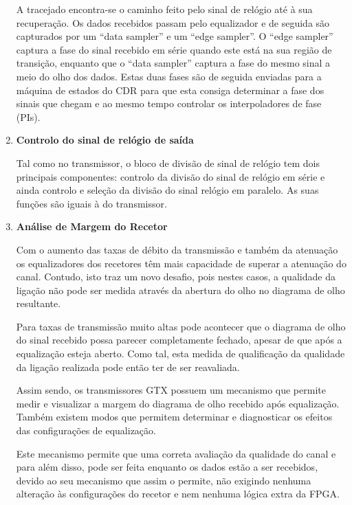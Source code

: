 \begin{enumerate}
	\hspace{1.0em}A tracejado encontra-se o caminho feito pelo sinal de relógio até à sua recuperação. 
	Os dados recebidos passam pelo equalizador e de seguida são capturados por um “data sampler” e um “edge sampler”. O “edge sampler” captura a fase do sinal recebido em série quando este está na sua região de transição, enquanto que o “data sampler” captura a fase do mesmo sinal a meio do olho dos dados. Estas duas fases são de seguida enviadas para a máquina de estados do CDR para que esta consiga determinar a fase dos sinais que chegam e ao mesmo tempo controlar os interpoladores de fase (PIs).
	
	\item \textbf{Controlo do sinal de relógio de saída} 
	
	Tal como no transmissor, o bloco de divisão de sinal de relógio tem dois principais componentes: controlo da divisão do sinal de relógio em série e ainda controlo e seleção da divisão do sinal relógio em paralelo. As suas funções são iguais à do transmissor.
	
	\item \textbf{Análise de Margem do Recetor}
	
	\hspace{1.0em}Com o aumento das taxas de débito da transmissão e também da atenuação os equalizadores dos recetores têm mais capacidade de superar a atenuação do canal. Contudo, isto traz um novo desafio, pois nestes casos, a qualidade da ligação não pode ser medida através da abertura do olho no diagrama de olho resultante. 
	
	\hspace{1.0em}Para taxas de transmissão muito altas pode acontecer que o diagrama de olho do sinal recebido possa parecer completamente fechado, apesar de que após a equalização esteja aberto. Como tal, esta medida de qualificação da qualidade da ligação realizada pode então ter de ser reavaliada.
	
	\hspace{1.0em}Assim sendo, os transmissores GTX possuem um mecanismo que permite medir e visualizar a margem do diagrama de olho recebido após equalização. Também existem modos que permitem determinar e diagnosticar os efeitos das configurações de equalização.
	
	\hspace{1.0em}Este mecanismo permite que uma correta avaliação da qualidade do canal e para além disso, pode ser feita enquanto os dados estão a ser recebidos, devido ao seu mecanismo que assim o permite, não exigindo nenhuma alteração às configurações do recetor e nem nenhuma lógica extra da FPGA. 
	

\end{enumerate}
